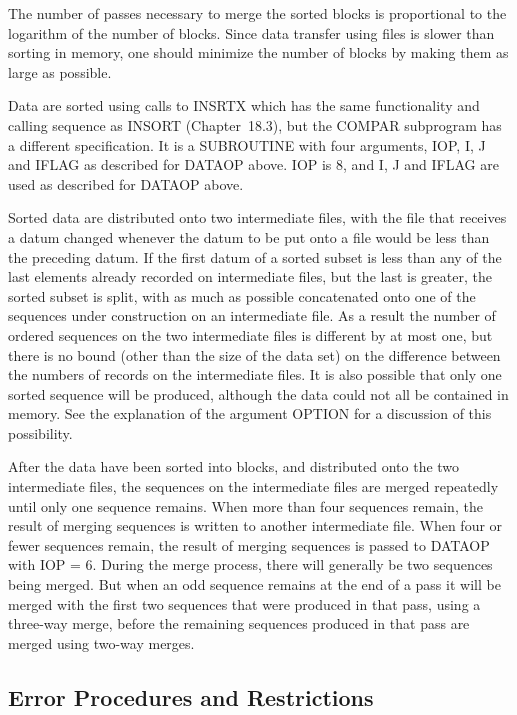 \documentclass[twoside]{MATH77}
\begin{document}
The number of passes necessary to merge the sorted blocks is
proportional to the logarithm of the number of blocks.  Since data
transfer using files is slower than sorting in memory, one should
minimize the number of blocks by making them as large as possible.

Data are sorted using calls to INSRTX which has the same functionality and
calling sequence as INSORT (Chapter~18.3), but the COMPAR subprogram has a
different specification.  It is a SUBROUTINE with four arguments, IOP, I,
J and IFLAG as described for DATAOP above.  IOP is 8, and I, J and IFLAG
are used as described for DATAOP above.

Sorted data are distributed onto two intermediate files, with the file
that receives a datum changed whenever the datum to be put onto a file
would be less than the preceding datum.  If the first datum of a sorted
subset is less than any of the last elements already recorded on
intermediate files, but the last is greater, the sorted subset is split,
with as much as possible concatenated onto one of the sequences under
construction on an intermediate file.  As a result the number of ordered
sequences on the two intermediate files is different by at most one, but
there is no bound (other than the size of the data set) on the difference
between the numbers of records on the intermediate files.  It is also
possible that only one sorted sequence will be produced, although the data
could not all be contained in memory.  See the explanation of the argument
OPTION for a discussion of this possibility.

After the data have been sorted into blocks, and distributed onto the two
intermediate files, the sequences on the intermediate files are merged
repeatedly until only one sequence remains. When more than four sequences
remain, the result of merging sequences is written to another intermediate
file. When four or fewer sequences remain, the result of merging sequences
is passed to DATAOP with IOP = 6. During the merge process, there will
generally be two sequences being merged. But when an odd sequence remains at
the end of a pass it will be merged with the first two sequences that were
produced in that pass, using a three-way merge, before the remaining
sequences produced in that pass are merged using two-way merges.

\subsection{Error Procedures and Restrictions}
\end{document}

